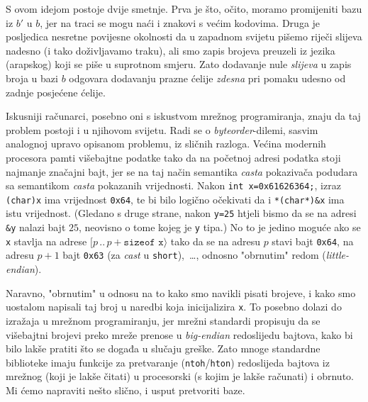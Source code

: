 S ovom idejom postoje dvije smetnje. Prva je što, očito, moramo promijeniti bazu iz $b'$ u $b$, jer na traci se mogu naći i znakovi s većim kodovima. Druga je posljedica nesretne povijesne okolnosti da u zapadnom svijetu pišemo riječi slijeva nadesno (i tako doživljavamo traku), ali smo zapis brojeva preuzeli iz jezika (arapskog) koji se piše u suprotnom smjeru. Zato dodavanje nule \emph{slijeva} u zapis broja u bazi $b$ odgovara dodavanju prazne ćelije \emph{zdesna} pri pomaku udesno od zadnje posjećene ćelije.

Iskusniji računarci, posebno oni s iskustvom mrežnog programiranja, znaju da taj problem postoji i u njihovom svijetu. Radi se o \emph{byteorder}-dilemi, sasvim analognoj upravo opisanom problemu, iz sličnih razloga. Većina modernih procesora pamti višebajtne podatke tako da na početnoj adresi podatka stoji najmanje značajni bajt, jer se na taj način semantika \emph{casta} pokazivača podudara sa semantikom \emph{casta} pokazanih vrijednosti. Nakon \texttt{int x=0x61626364;}, izraz \texttt{(char)x} ima vrijednost \texttt{0x64}, te bi bilo logično očekivati da i \texttt{*(char*)\&x} ima istu vrijednost. (Gledano s druge strane, nakon \texttt{y=25} htjeli bismo da se na adresi \texttt{\&y} nalazi bajt $25$, neovisno o tome kojeg je \texttt y tipa.) No to je jedino moguće ako se \texttt x stavlja na adrese $[p\,..\,p+\texttt{sizeof x}\rangle$ tako da se na adresu $p$ stavi bajt \texttt{0x64}, na adresu $p+1$ bajt \texttt{0x63} (za \emph{cast} u \texttt{short}),~\ldots, odnosno "obrnutim" redom (\emph{little-endian}).

Naravno, "obrnutim" u odnosu na to kako smo navikli pisati brojeve, i kako smo uostalom napisali taj broj u naredbi koja inicijalizira \texttt x. To posebno dolazi do izražaja u mrežnom programiranju, jer mrežni standardi propisuju da se višebajtni brojevi preko mreže prenose u \emph{big-endian} redoslijedu bajtova, kako bi bilo lakše pratiti što se događa u slučaju greške. Zato mnoge standardne biblioteke imaju funkcije za pretvaranje (\texttt{ntoh}/\texttt{hton}) redoslijeda bajtova iz mrežnog (koji je lakše čitati) u procesorski (s kojim je lakše računati) i obrnuto. Mi ćemo napraviti nešto slično, i usput pretvoriti baze.


